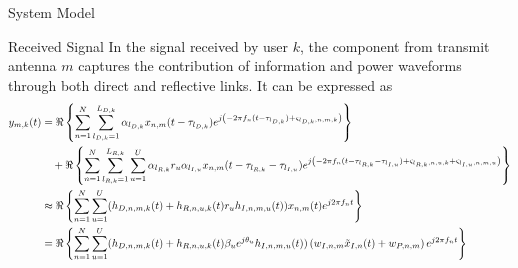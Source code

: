 \documentclass{IEEEtran}
\begin{document}
\begin{section} {System Model}
        \begin{subsection} {Received Signal}
            In the signal received by user $k$, the component from transmit antenna $m$ captures the contribution of information and power waveforms through both direct and reflective links. It can be expressed as
            \begin{equation} \label{eq:y_{m,k}(t)}
                \begin{split}
                    y_{m,k}(t)
                    &= \Re \left\{ \sum_{n=1}^{N} \sum_{l_{D,k}=1}^{L_{D,k}} \alpha_{l_{D,k}} x_{n,m}(t-\tau_{l_{D,k}}) e^{j \left( -2 \pi f_n (t-\tau_{l_{D,k}})+\varsigma_{l_{D,k},n,m,k}\right) } \right\} \\
                    &\quad+ \Re \left\{ \sum_{n=1}^{N} \sum_{l_{R,k}=1}^{L_{R,k}} \sum_{u=1}^{U} \alpha_{l_{R,k}} r_u \alpha_{l_{I,u}} x_{n,m}(t-\tau_{l_{R,k}}-\tau_{l_{I,u}}) e^{j \left( -2 \pi f_n (t-\tau_{l_{R,k}}-\tau_{l_{I,u}})+\varsigma_{l_{R,k},n,u,k}+\varsigma_{l_{I,u},n,m,u}\right)} \right\} \\
                    &\approx \Re \left\{ \sum_{n=1}^{N} \sum_{u=1}^{U} (h_{D,n,m,k}(t)+h_{R,n,u,k}(t) r_u h_{I,n,m,u}(t)) x_{n,m}(t) e^{j2 \pi f_n t} \right\} \\
                    &= \Re \left\{ \sum_{n=1}^{N} \sum_{u=1}^{U} (h_{D,n,m,k}(t)+h_{R,n,u,k}(t) \beta_u e^{j\theta_u} h_{I,n,m,u}(t)) \left( w_{I,n,m} \tilde{x}_{I,n}(t)+w_{P,n,m} \right) e^{j2{\pi} {f_n}{t}} \right\}
                \end{split}
            \end{equation}

        \end{subsection}
    \end{section}

    
    
\end{document}
